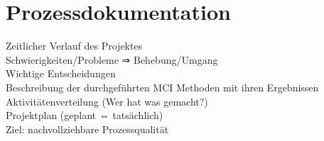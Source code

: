 
\chapter{Prozessdokumentation}

Zeitlicher Verlauf des Projektes\\
Schwierigkeiten/Probleme ⇒ Behebung/Umgang\\
Wichtige Entscheidungen\\
Beschreibung der durchgeführten MCI Methoden mit ihren Ergebnissen\\
Aktivitätenverteilung (Wer hat was gemacht?)\\
Projektplan (geplant ⇔ tatsächlich)\\
Ziel: nachvollziehbare Prozessqualität\\

\newpage



\newpage



\newpage



\newpage



\newpage




